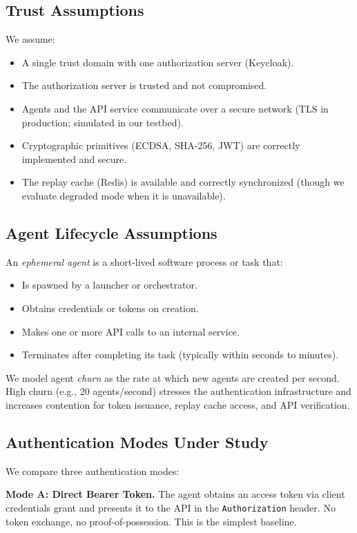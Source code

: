 \documentclass[conference,10pt]{IEEEtran}
\begin{document}
\subsection{Trust Assumptions}

We assume:
\begin{itemize}
    \item A single trust domain with one authorization server (Keycloak).
    \item The authorization server is trusted and not compromised.
    \item Agents and the API service communicate over a secure network (TLS in production; simulated in our testbed).
    \item Cryptographic primitives (ECDSA, SHA-256, JWT) are correctly implemented and secure.
    \item The replay cache (Redis) is available and correctly synchronized (though we evaluate degraded mode when it is unavailable).
\end{itemize}

\subsection{Agent Lifecycle Assumptions}

An \textit{ephemeral agent} is a short-lived software process or task that:
\begin{itemize}
    \item Is spawned by a launcher or orchestrator.
    \item Obtains credentials or tokens on creation.
    \item Makes one or more API calls to an internal service.
    \item Terminates after completing its task (typically within seconds to minutes).
\end{itemize}

We model agent \textit{churn} as the rate at which new agents are created per second. High churn (e.g., 20 agents/second) stresses the authentication infrastructure and increases contention for token issuance, replay cache access, and API verification.

\subsection{Authentication Modes Under Study}

We compare three authentication modes:

\textbf{Mode A: Direct Bearer Token.}
The agent obtains an access token via client credentials grant and presents it to the API in the \texttt{Authorization} header. No token exchange, no proof-of-possession. This is the simplest baseline.
\end{document}
